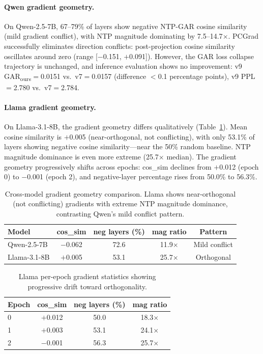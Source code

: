 \documentclass[11pt]{article}
\newcommand{\gar}{\textsc{GAR}}
\newcommand{\garours}{\textsc{GAR}\textsubscript{ours}}
\begin{document}
\paragraph{Qwen gradient geometry.} On Qwen-2.5-7B, 67--79\% of layers show negative NTP-\gar{} cosine similarity (mild gradient conflict), with NTP magnitude dominating by 7.5--14.7$\times$. PCGrad successfully eliminates direction conflicts: post-projection cosine similarity oscillates around zero (range [$-$0.151, $+$0.091]). However, the \gar{} loss collapse trajectory is unchanged, and inference evaluation shows no improvement: v9 \garours{}$=$0.0151 vs.\ v7$=$0.0157 (difference $<$0.1 percentage points), v9 PPL$=$2.780 vs.\ v7$=$2.784.

\paragraph{Llama gradient geometry.} On Llama-3.1-8B, the gradient geometry differs qualitatively (Table~\ref{tab:gradient_geometry}). Mean cosine similarity is $+$0.005 (near-orthogonal, not conflicting), with only 53.1\% of layers showing negative cosine similarity---near the 50\% random baseline. NTP magnitude dominance is even more extreme (25.7$\times$ median). The gradient geometry progressively shifts across epochs: cos\_sim declines from $+$0.012 (epoch 0) to $-$0.001 (epoch 2), and negative-layer percentage rises from 50.0\% to 56.3\%.

\begin{table}[t]
\centering
\small
\caption{Cross-model gradient geometry comparison. Llama shows near-orthogonal (not conflicting) gradients with extreme NTP magnitude dominance, contrasting Qwen's mild conflict pattern.}
\label{tab:gradient_geometry}
\begin{tabular}{lcccc}
\toprule
\textbf{Model} & \textbf{cos\_sim} & \textbf{neg layers (\%)} & \textbf{mag ratio} & \textbf{Pattern} \\
\midrule
Qwen-2.5-7B & $-$0.062 & 72.6 & 11.9$\times$ & Mild conflict \\
Llama-3.1-8B & $+$0.005 & 53.1 & 25.7$\times$ & Orthogonal \\
\bottomrule
\end{tabular}
\end{table}

\begin{table}[t]
\centering
\small
\caption{Llama per-epoch gradient statistics showing progressive drift toward orthogonality.}
\label{tab:llama_epochs}
\begin{tabular}{lccc}
\toprule
\textbf{Epoch} & \textbf{cos\_sim} & \textbf{neg layers (\%)} & \textbf{mag ratio} \\
\midrule
0 & $+$0.012 & 50.0 & 18.3$\times$ \\
1 & $+$0.003 & 53.1 & 24.1$\times$ \\
2 & $-$0.001 & 56.3 & 25.7$\times$ \\
\bottomrule
\end{tabular}
\end{table}
\end{document}

